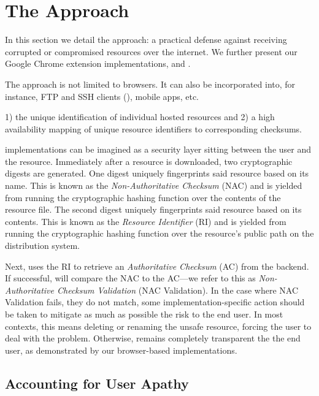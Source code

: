 \section{The \SYSTEM{} Approach} \label{sec:approach}

In this section we detail the \SYSTEM{} approach: a practical defense against
receiving corrupted or compromised resources over the internet. We further
present our Google Chrome extension implementations, \DNSSYS{} and \DHTSYS{}.

The \SYSTEM{} approach is not limited to browsers. It can also be incorporated
into, for instance, FTP and SSH clients (), mobile apps, etc.

 1) the unique identification
of individual hosted resources and 2) a high availability mapping of unique
resource identifiers to corresponding checksums.

\SYSTEM{} implementations can be imagined as a security layer sitting between
the user and the resource. Immediately after a resource is downloaded, two
cryptographic digests are generated. One digest uniquely fingerprints said
resource based on its name. This is known as the \emph{Non-Authoritative
Checksum} (NAC) and is yielded from running the cryptographic hashing function
over the contents of the resource file. The second digest uniquely fingerprints
said resource based on its contents. This is known as the \emph{Resource
Identifier} (RI) and is yielded from running the cryptographic hashing function
over the resource's public path on the distribution system.

Next, \SYSTEM{} uses the RI to retrieve an \emph{Authoritative Checksum} (AC)
from the backend. If successful, \SYSTEM{} will compare the NAC to the AC---we
refer to this as \emph{Non-Authoritative Checksum Validation} (NAC Validation).
In the case where NAC Validation fails, \ie they do not match, some
implementation-specific action should be taken to mitigate as much as possible
the risk to the end user. In most contexts, this means deleting or renaming the
unsafe resource, forcing the user to deal with the problem. Otherwise, \SYSTEM{}
remains completely transparent the the end user, as demonstrated by our
browser-based implementations.


\subsection{Accounting for User Apathy}

